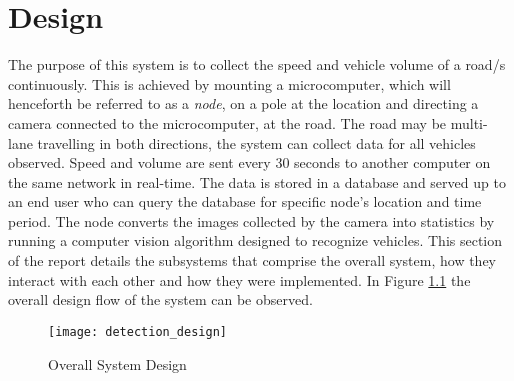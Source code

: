 \chapter{Design}

The purpose of this system is to collect the speed and vehicle volume of a road/s continuously. This is achieved by mounting a microcomputer, which will henceforth be referred to as a \emph{node}, on a pole at the location and directing a camera connected to the microcomputer, at the road. The road may be multi-lane travelling in both directions, the system can collect data for all vehicles observed. Speed and volume are sent every 30 seconds to another computer on the same network in real-time. The data is stored in a database and served up to an end user who can query the database for specific node's location and time period. The node converts the images collected by the camera into statistics by running a computer vision algorithm designed to recognize vehicles. This section of the report details the subsystems that comprise the overall system, how they interact with each other and how they were implemented. In Figure \ref{fig:overall_design} the overall design flow of the system can be observed. 
\begin{figure}[H]
    \centering
    \texttt{[image: detection\_design]}
    \caption{Overall System Design}
    \label{fig:overall_design}
\end{figure}




